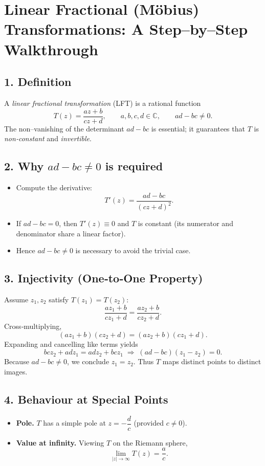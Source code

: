 \documentclass[12pt]{article}
\title{}
\author{Jerich Lee}
\date{\today}
\theoremstyle{definition} %
\theoremstyle{plain} %
\begin{document}
\maketitle
\section*{Linear Fractional (Möbius) Transformations:  A Step--by--Step Walkthrough}

\subsection*{1. Definition}
A \emph{linear fractional transformation} (LFT) is a rational function
\[
   T(z)=\frac{az+b}{cz+d},
   \qquad a,b,c,d\in\mathbb C,
   \qquad ad-bc\neq0.
\]
The non–vanishing of the determinant $ad-bc$ is essential; it guarantees that
$T$ is \emph{non‑constant} and \emph{invertible}.

\subsection*{2. Why \boldmath$ad-bc\neq0$ is required}
\begin{itemize}
  \item Compute the derivative:
        \[
           T'(z)=\frac{ad-bc}{(cz+d)^{2}}.
        \]
  \item If $ad-bc=0$, then $T'(z)\equiv0$ and $T$ is constant
        (its numerator and denominator share a linear factor).
  \item Hence $ad-bc\neq0$ is necessary to avoid the trivial case.
\end{itemize}

\subsection*{3. Injectivity (One‑to‑One Property)}
Assume $z_{1},z_{2}$ satisfy $T(z_{1})=T(z_{2})$:
\[
   \frac{az_{1}+b}{cz_{1}+d} = \frac{az_{2}+b}{cz_{2}+d}.
\]
Cross‑multiplying,
\[
   (az_{1}+b)(cz_{2}+d)=(az_{2}+b)(cz_{1}+d).
\]
Expanding and cancelling like terms yields
\[
   bc z_{2}+ad z_{1}=ad z_{2}+bc z_{1}
   \;\Longrightarrow\;
   (ad-bc)(z_{1}-z_{2})=0.
   \]
Because $ad-bc\neq0$, we conclude $z_{1}=z_{2}$.
Thus $T$ maps distinct points to distinct images.

\subsection*{4. Behaviour at Special Points}
\begin{itemize}
  \item \textbf{Pole.}  $T$ has a simple pole at $z=-\dfrac{d}{c}$ (provided $c\neq0$).
  \item \textbf{Value at infinity.}  Viewing $T$ on the Riemann sphere,
        \[
            \lim_{|z|\to\infty}T(z)=\frac{a}{c}.
        \]
\end{itemize}
\end{document}
